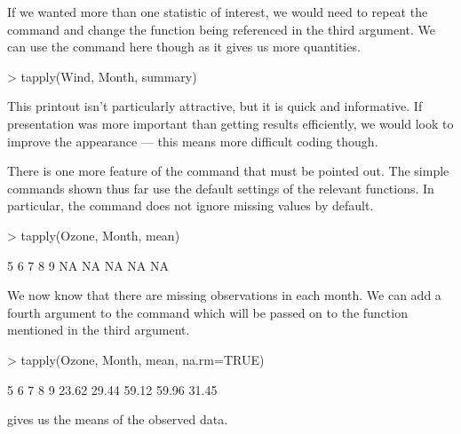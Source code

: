 If we wanted more than one statistic of interest, we would need to repeat the command and change the function being referenced in the third argument. We can use the  command here though as it gives us more quantities.
\begin{Schunk}
\begin{Sinput}
> tapply(Wind, Month, summary)
\end{Sinput}
\end{Schunk}

This printout isn't particularly attractive, but it is quick and informative. If presentation was more important than getting results efficiently, we would look to improve the appearance --- this means more difficult coding though.

There is one more feature of the  command that must be pointed out. The simple commands shown thus far use the default settings of the relevant functions. In particular, the  command does not ignore missing values by default.
\begin{Schunk}
\begin{Sinput}
> tapply(Ozone, Month, mean)
\end{Sinput}
\begin{Soutput}
 5  6  7  8  9 
NA NA NA NA NA 
\end{Soutput}
\end{Schunk}
We now know that there are missing  observations in each month. We can add a fourth argument to the command which will be passed on to the function mentioned in the third argument.
\begin{Schunk}
\begin{Sinput}
> tapply(Ozone, Month, mean, na.rm=TRUE)
\end{Sinput}
\begin{Soutput}
    5     6     7     8     9 
23.62 29.44 59.12 59.96 31.45 
\end{Soutput}
\end{Schunk}
gives us the means of the observed data.

